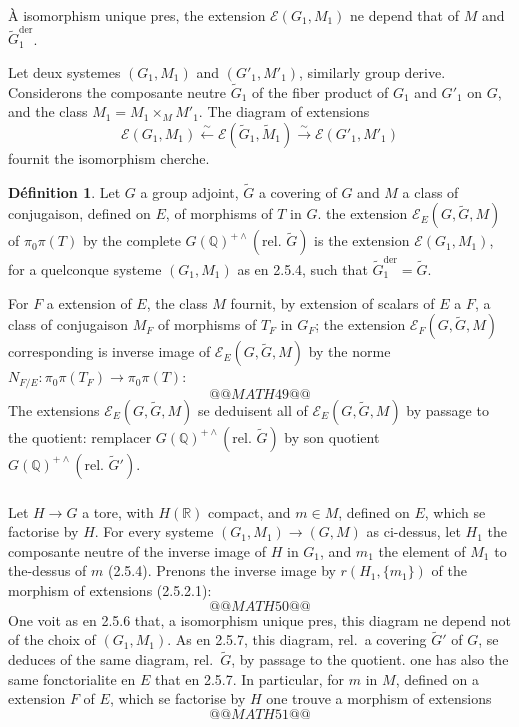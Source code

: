 \documentclass[12pt,a4paper]{article}
\theoremstyle{plain}
\theoremstyle{definition}
\newtheorem{definition}[theorem]{D\'efinition}
\theoremstyle{remark}
\newcommand{\QQ}{\mathbb{Q}}
\newcommand{\RR}{\mathbb{R}}
\begin{document}
\`A isomorphism unique pres, the extension $\mathscr{E}(G_1,M_1)$ ne depend that of $M$ and $\tilde{G}_1^{\text{der}}$.

Let deux systemes $(G_1,M_1)$ and $(G'_1,M'_1)$, similarly group derive. Considerons the composante neutre $\tilde{G}_1$ of the fiber product of $G_1$ and $G'_1$ on $G$, and the class $M_1 = M_1 \times_M M'_1$. The diagram of extensions
\[
\mathscr{E}(G_1,M_1) \xleftarrow{\sim} \mathscr{E}(\tilde{G}_1,\tilde{M}_1) \xrightarrow{\sim} \mathscr{E}(G'_1,M'_1)
\]
fournit the isomorphism cherche.

\begin{definition}
Let $G$ a group adjoint, $\tilde{G}$ a covering of $G$ and $M$ a class of conjugaison, defined on $E$, of morphisms of $T$ in $G$. the extension $\mathscr{E}_E(G,\tilde{G},M)$ of $\pi_0\pi(T)$ by the complete $G(\QQ)^{+\wedge}(\text{rel.~}\tilde{G})$ is the extension $\mathscr{E}(G_1,M_1)$, for a quelconque systeme $(G_1,M_1)$ as en 2.5.4, such that $\tilde{G}_1^{\text{der}} = \tilde{G}$.
\end{definition}

For $F$ a extension of $E$, the class $M$ fournit, by extension of scalars of $E$ a $F$, a class of conjugaison $M_F$ of morphisms of $T_F$ in $G_F$; the extension $\mathscr{E}_F(G,\tilde{G},M)$ corresponding is inverse image of $\mathscr{E}_E(G,\tilde{G},M)$ by the norme $N_{F/E}: \pi_0\pi(T_F) \to \pi_0\pi(T)$:
\[
@@MATH49@@
\]
The extensions $\mathscr{E}_E(G,\tilde{G},M)$ se deduisent all of $\mathscr{E}_E(G,\tilde{G},M)$ by passage to the quotient: remplacer $G(\QQ)^{+\wedge}(\text{rel.~}\tilde{G})$ by son quotient $G(\QQ)^{+\wedge}(\text{rel.~}\tilde{G}')$.

\subsubsection{}

Let $H \to G$ a tore, with $H(\RR)$ compact, and $m \in M$, defined on $E$, which se factorise by $H$. For every systeme $(G_1,M_1) \to (G,M)$ as ci-dessus, let $H_1$ the composante neutre of the inverse image of $H$ in $G_1$, and $m_1$ the element of $M_1$ to the-dessus of $m$ (2.5.4). Prenons the inverse image by $r(H_1,\{m_1\})$ of the morphism of extensions (2.5.2.1):
\[
@@MATH50@@
\]
One voit as en 2.5.6 that, a isomorphism unique pres, this diagram ne depend not of the choix of $(G_1,M_1)$. As en 2.5.7, this diagram, rel.~a covering $\tilde{G}'$ of $G$, se deduces of the same diagram, rel.~$\tilde{G}$, by passage to the quotient. one has also the same fonctorialite en $E$ that en 2.5.7. In particular, for $m$ in $M$, defined on a extension $F$ of $E$, which se factorise by $H$ one trouve a morphism of extensions
\[
@@MATH51@@
\]
\end{document}
